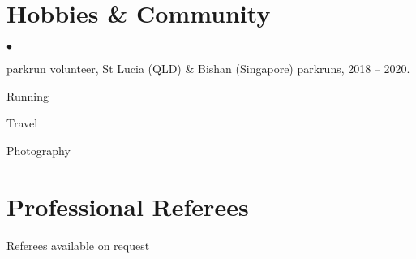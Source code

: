 \documentclass[margin,line]{resume}
\newenvironment{list2}{
  \begin{list}{$\bullet$}{%
      \setlength{\itemsep}{0in}
      \setlength{\parsep}{0in} \setlength{\parskip}{0in}
      \setlength{\topsep}{0in} \setlength{\partopsep}{0in}
      \setlength{\leftmargin}{0.2in}}}{\end{list}}
\begin{document}
\begin{resume}
\section{\sc Hobbies \& Community}
\begin{list2}
\item parkrun volunteer, St Lucia (QLD) \& Bishan (Singapore) parkruns, 2018 -- 2020.
\item Running
\item Travel
\item Photography
\end{list2}

\section{\sc Professional Referees}
Referees available on request


\end{resume}
\end{document}
